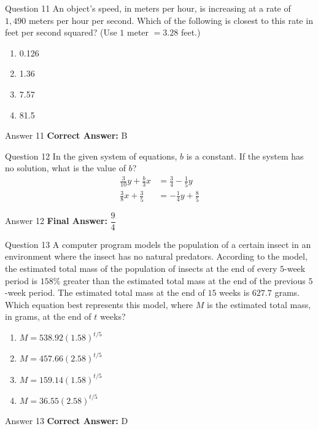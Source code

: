 \documentclass{beamer}
\begin{document}
\begin{frame}{Question 11}
\small
An object's speed, in meters per hour, is increasing at a rate of \(1{,}490\)
meters per hour per second. Which of the following is closest to this rate in
feet per second squared? (Use \(1\) meter \(=3.28\) feet.)
\vspace{0.35cm}
\begin{enumerate}
    \item[A.] 0.126
    \item[B.] 1.36
    \item[C.] 7.57
    \item[D.] 81.5
\end{enumerate}
\end{frame}
\begin{frame}{Answer 11}
\small
\textbf{Correct Answer:} B
\end{frame}

\begin{frame}{Question 12}
\small
In the given system of equations, \(b\) is a constant. If the system has no
solution, what is the value of \(b\)?
\[
\begin{aligned}
\frac3{10}y+\frac b3x&=\frac34-\frac15y\\
\frac38x+\frac35&=-\frac14y+\frac85
\end{aligned}
\]
\end{frame}
\begin{frame}{Answer 12}
\small
\textbf{Final Answer:} $\boxed{\dfrac{9}{4}}$
\end{frame}

\begin{frame}{Question 13}
\small
A computer program models the population of a certain insect in an environment
where the insect has no natural predators. According to the model, the estimated
total mass of the population of insects at the end of every \(5\)-week period is
\(158\%\) greater than the estimated total mass at the end of the previous
\(5\)-week period. The estimated total mass at the end of \(15\) weeks is
\(627.7\) grams. Which equation best represents this model, where \(M\) is the
estimated total mass, in grams, at the end of \(t\) weeks?
\vspace{0.35cm}
\begin{enumerate}
    \item[A.] \(M=538.92(1.58)^{t/5}\)
    \item[B.] \(M=457.66(2.58)^{t/5}\)
    \item[C.] \(M=159.14(1.58)^{t/5}\)
    \item[D.] \(M=36.55(2.58)^{t/5}\)
\end{enumerate}
\end{frame}
\begin{frame}{Answer 13}
\small
\textbf{Correct Answer:} D
\end{frame}
\end{document}
